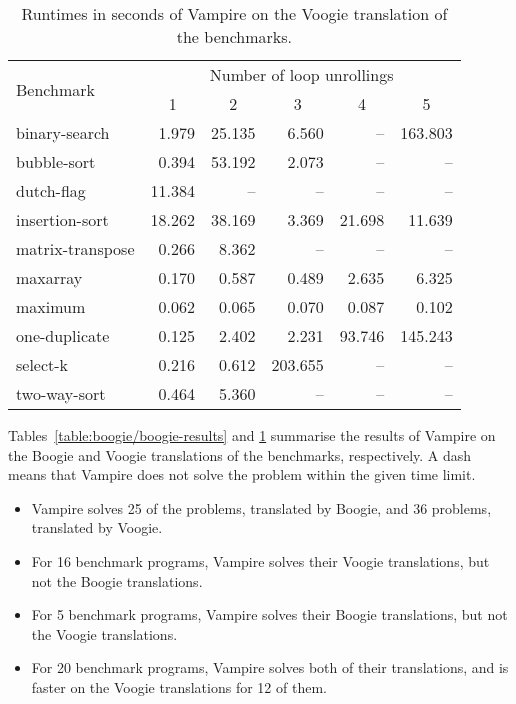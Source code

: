 \begin{table}\center
  \caption{Runtimes in seconds of Vampire on the Voogie translation of the benchmarks.}
  \label{table:boogie/voogie-results}
  \begin{tabular}[ht]{lrrrrr}
\hline
\multirow{2}{*}{Benchmark} & \multicolumn{5}{c}{Number of loop unrollings} \\ %
& \multicolumn{1}{c}{1} & \multicolumn{1}{c}{2} & \multicolumn{1}{c}{3} & \multicolumn{1}{c}{4} & \multicolumn{1}{c}{5} \\
\hline
binary-search    &  1.979 & 25.135 &   6.560 &     -- & 163.803 \\
bubble-sort      &  0.394 & 53.192 &   2.073 &     -- &      -- \\
dutch-flag       & 11.384 &     -- &      -- &     -- &      -- \\
insertion-sort   & 18.262 & 38.169 &   3.369 & 21.698 &  11.639 \\
matrix-transpose &  0.266 &  8.362 &      -- &     -- &      -- \\
maxarray         &  0.170 &  0.587 &   0.489 &  2.635 &   6.325 \\
maximum          &  0.062 &  0.065 &   0.070 &  0.087 &   0.102 \\
one-duplicate    &  0.125 &  2.402 &   2.231 & 93.746 & 145.243 \\
select-k         &  0.216 &  0.612 & 203.655 &     -- &      -- \\
two-way-sort     &  0.464 &  5.360 &      -- &     -- &      -- \\
  \end{tabular}
\end{table}

Tables~\ref{table:boogie/boogie-results} and \ref{table:boogie/voogie-results} summarise the results of Vampire on the Boogie and Voogie translations of the benchmarks, respectively. A dash means that Vampire does not solve the problem within the given time limit.
\begin{itemize}
  \item Vampire solves 25 of the problems, translated by Boogie, and 36 problems, translated by Voogie.
  \item For 16 benchmark programs, Vampire solves their Voogie translations, but not the Boogie translations.
  \item For 5 benchmark programs, Vampire solves their Boogie translations, but not the Voogie translations.
  \item For 20 benchmark programs, Vampire solves both of their translations, and is faster on the Voogie translations for 12 of them.
\end{itemize}

